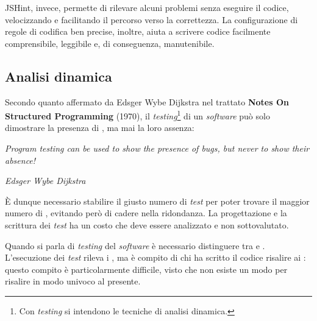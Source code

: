 JSHint, invece, permette di rilevare alcuni problemi senza eseguire il codice, velocizzando e facilitando il percorso verso la correttezza. La configurazione di regole di codifica ben precise, inoltre, aiuta a scrivere codice facilmente comprensibile, leggibile e, di conseguenza, manutenibile. 

\subsection{Analisi dinamica}
Secondo quanto affermato da Edsger Wybe Dijkstra nel trattato \textbf{Notes On Structured Programming} (1970), il \textit{testing}\footnote{Con \textit{testing} si intendono le tecniche di analisi dinamica.} di un \textit{software} può solo dimostrare la presenza di , ma mai la loro assenza:

\begin{displayquote}
\centering
\textit{Program testing can be used to show the presence of bugs, but never to show their absence!}

\textit{Edsger Wybe Dijkstra}
\end{displayquote}

È dunque necessario stabilire il giusto numero di \textit{test} per poter trovare il maggior numero di , evitando però di cadere nella ridondanza. La progettazione e la scrittura dei \textit{test} ha un costo che deve essere analizzato e non sottovalutato. 

Quando si parla di \textit{testing} del \textit{software} è necessario distinguere tra  e . L'esecuzione dei \textit{test} rileva i , ma è compito di chi ha scritto il codice risalire ai : questo compito è particolarmente difficile, visto che non esiste un modo per risalire in modo univoco al  presente.

